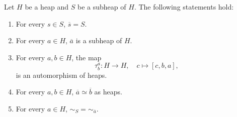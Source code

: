 \documentclass[graybox]{svmult}
\begin{document}
\begin{theorem}
    Let $H$ be a heap and $S$ be a subheap of $H$. The following statements hold:
    \begin{enumerate}
        \item For every $s\in S$, $\overline{s}=S$. 
        \item For every $a\in H$, $\overline{a}$ is a subheap of $H$.
        \item For every $a,b\in H$, 
        the map
        \[
        \tau_b^a\colon H\to H,\quad
        c\mapsto [c,b,a],
        \]
        is an automorphism of heaps. 
        \item For every $a,b\in H$, 
        $\overline{a}\simeq\overline{b}$ as heaps. 
        \item For every $a\in H$, $\sim_S=\sim_{\overline{a}}$. 
    \end{enumerate}
\end{theorem}
\end{document}
